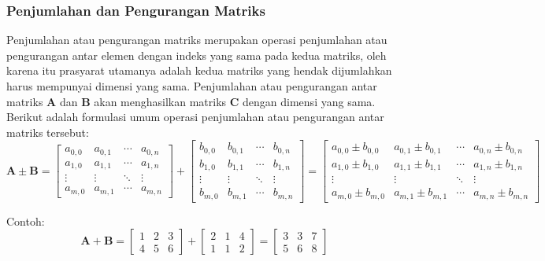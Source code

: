 \subsubsection{Penjumlahan dan Pengurangan Matriks}
Penjumlahan atau pengurangan matriks merupakan operasi penjumlahan atau pengurangan antar elemen dengan indeks yang sama pada kedua matriks, oleh karena itu prasyarat utamanya adalah kedua matriks yang hendak dijumlahkan harus mempunyai dimensi yang sama. Penjumlahan atau pengurangan antar matriks $\mathbf{A}$ dan $\mathbf{B}$ akan menghasilkan matriks $\mathbf{C}$ dengan dimensi yang sama. Berikut adalah formulasi umum operasi penjumlahan atau pengurangan antar matriks tersebut:
\begin{dmath}\label{eqn:eqn4}
    \textbf{A} \pm \textbf{B} = \begin{bmatrix}a_{0,0} & a_{0,1} & \cdots & a_{0,n}\\ a_{1,0} & a_{1,1} & \cdots & a_{1,n} \\ \vdots & \vdots & \ddots & \vdots \\ a_{m,0} & a_{m,1} & \cdots & a_{m,n}\end{bmatrix} + \begin{bmatrix}b_{0,0} & b_{0,1} & \cdots & b_{0,n}\\ b_{1,0} & b_{1,1} & \cdots & b_{1,n} \\ \vdots & \vdots & \ddots & \vdots \\ b_{m,0} & b_{m,1} & \cdots & b_{m,n}\end{bmatrix} = \begin{bmatrix}a_{0,0} \pm b_{0,0} & a_{0,1} \pm b_{0,1} & \cdots & a_{0,n} \pm b_{0,n}\\ a_{1,0} \pm b_{1,0} & a_{1,1} \pm b_{1,1} & \cdots & a_{1,n} \pm b_{1,n} \\ \vdots & \vdots & \ddots & \vdots \\ a_{m,0} \pm b_{m,0} & a_{m,1} \pm b_{m,1} & \cdots & a_{m,n} \pm b_{m,n}\end{bmatrix}
\end{dmath}

Contoh:
\begin{equation*}
    \textbf{A} + \textbf{B} = \begin{bmatrix}1 & 2 & 3 \\ 4 & 5 & 6\end{bmatrix} + \begin{bmatrix}2 & 1 & 4\\ 1 & 1 & 2\end{bmatrix} = \begin{bmatrix}3 & 3 & 7 \\ 5 & 6 & 8 \end{bmatrix}
\end{equation*}

